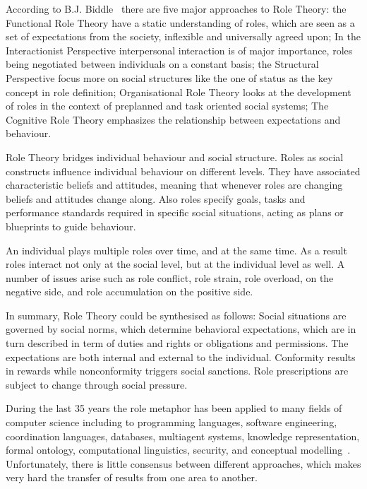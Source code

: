 \documentclass[a4paper,12pt,oneside,fleqn]{book} %
\begin{document}
According to B.J. Biddle~\cite{biddle1986recent} there are five major
approaches to Role Theory: the Functional Role Theory have a static
understanding of roles, which are seen as a set of expectations from the
society, inflexible and universally agreed upon; In the Interactionist
Perspective interpersonal interaction is of major importance, roles being
negotiated between individuals on a constant basis; the Structural
Perspective focus more on social structures like the one of status as the
key concept in role definition; Organisational Role Theory looks at the
development of roles in the context of preplanned and task oriented social
systems; The Cognitive Role Theory emphasizes the relationship between
expectations and behaviour.

Role Theory bridges individual behaviour and social structure. Roles as
social constructs influence individual behaviour on different levels. They
have associated characteristic beliefs and attitudes, meaning that whenever
roles are changing beliefs and attitudes change along. Also roles specify
goals, tasks and performance standards required in specific social
situations, acting as plans or blueprints to guide behaviour.

An individual plays multiple roles over time, and at the same time. As a
result roles interact not only at the social level, but at the individual
level as well. A number of issues arise such as role conflict, role strain,
role overload, on the negative side, and role accumulation on the positive
side.

In summary, Role Theory could be synthesised as follows: Social situations
are governed by social norms, which determine behavioral expectations,
which are in turn described in term of duties and rights or obligations and
permissions. The expectations are both internal and external to the
individual. Conformity results in rewards while nonconformity triggers
social sanctions. Role prescriptions are subject to change through social
pressure.

During the last 35 years the role metaphor has been applied to many fields
of computer science including to programming languages, software
engineering, coordination languages, databases, multiagent systems,
knowledge representation, formal ontology, computational linguistics,
security, and conceptual modelling~\cite{DBLP:journals/ao/BoellaTV07}.
Unfortunately, there is little consensus between different approaches,
which makes very hard the transfer of results from one area to another.
\end{document}
